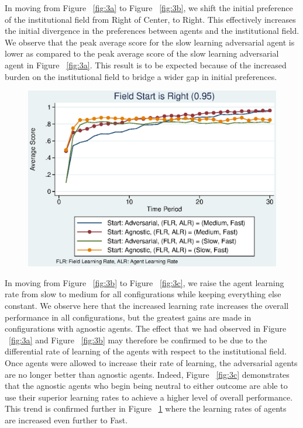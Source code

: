 \documentclass[12pt,letterpaper]{article}
\begin{document}
In moving from Figure ~\ref{fig:3a} to Figure ~\ref{fig:3b}, we shift the initial preference of the institutional field from Right of Center, to Right. This effectively increases the initial divergence in the preferences between agents and the institutional field. We observe that the peak average score for the slow learning adversarial agent is lower as compared to the peak average score of the slow learning adversarial agent in Figure ~\ref{fig:3a}. This result is to be expected because of the increased burden on the institutional field to bridge a wider gap in initial preferences.

\begin{figure}[h]
\begin{centering}
  \caption{}
  \includegraphics[width=\textwidth]{frcmedium3d}
  \label{fig:3d}
\end{centering}
\end{figure}

In moving from Figure ~\ref{fig:3b} to Figure ~\ref{fig:3c}, we raise the agent learning rate from slow to medium for all configurations while keeping everything else constant. We observe here that the increased learning rate increases the overall performance in all configurations, but the greatest gains are made in configurations with agnostic agents. The effect that we had observed in Figure ~\ref{fig:3a} and Figure ~\ref{fig:3b} may therefore be confirmed to be due to the differential rate of learning of the agents with respect to the institutional field. Once agents were allowed to increase their rate of learning, the adversarial agents are no longer better than agnostic agents. Indeed, Figure ~\ref{fig:3c} demonstrates that the agnostic agents who begin being neutral to either outcome are able to use their superior learning rates to achieve a higher level of overall performance. This trend is confirmed further in Figure ~\ref{fig:3d} where the learning rates of agents are increased even further to \textquotesingle Fast\textquotesingle .
\end{document}
